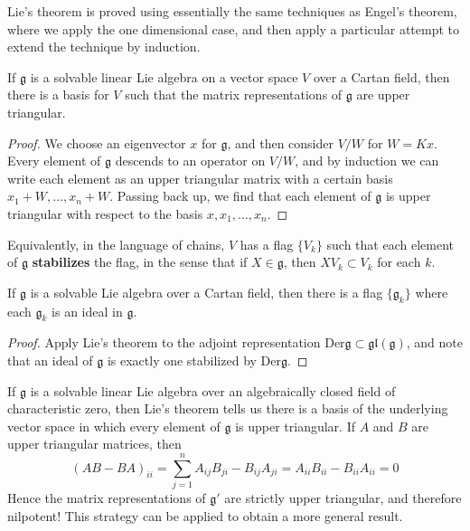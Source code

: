 Lie's theorem is proved using essentially the same techniques as Engel's theorem, where we apply the one dimensional case, and then apply a particular attempt to extend the technique by induction.

\begin{theorem}
    If $\mathfrak{g}$ is a solvable linear Lie algebra on a vector space $V$ over a Cartan field, then there is a basis for $V$ such that the matrix representations of $\mathfrak{g}$ are upper triangular.
\end{theorem}
\begin{proof}
    We choose an eigenvector $x$ for $\mathfrak{g}$, and then consider $V/W$ for $W = Kx$. Every element of $\mathfrak{g}$ descends to an operator on $V/W$, and by induction we can write each element as an upper triangular matrix with a certain basis $x_1 + W, \dots, x_n + W$. Passing back up, we find that each element of $\mathfrak{g}$ is upper triangular with respect to the basis $x, x_1, \dots, x_n$.
\end{proof}

Equivalently, in the language of chains, $V$ has a flag $\{ V_k \}$ such that each element of $\mathfrak{g}$ {\bf stabilizes} the flag, in the sense that if $X \in \mathfrak{g}$, then $XV_k \subset V_k$ for each $k$.

\begin{corollary}
    If $\mathfrak{g}$ is a solvable Lie algebra over a Cartan field, then there is a flag $\{ \mathfrak{g}_k \}$ where each $\mathfrak{g}_k$ is an ideal in $\mathfrak{g}$.
\end{corollary}
\begin{proof}
    Apply Lie's theorem to the adjoint representation $\text{Der} \mathfrak{g} \subset \mathfrak{gl}(\mathfrak{g})$, and note that an ideal of $\mathfrak{g}$ is exactly one stabilized by $\text{Der} \mathfrak{g}$.
\end{proof}

If $\mathfrak{g}$ is a solvable linear Lie algebra over an algebraically closed field of characteristic zero, then Lie's theorem tells us there is a basis of the underlying vector space in which every element of $\mathfrak{g}$ is upper triangular. If $A$ and $B$ are upper triangular matrices, then
%
\[ (AB - BA)_{ii} = \sum_{j = 1}^n A_{ij}B_{ji} - B_{ij}A_{ji} = A_{ii}B_{ii} - B_{ii}A_{ii} = 0 \]
%
Hence the matrix representations of $\mathfrak{g}'$ are strictly upper triangular, and therefore nilpotent! This strategy can be applied to obtain a more general result.

